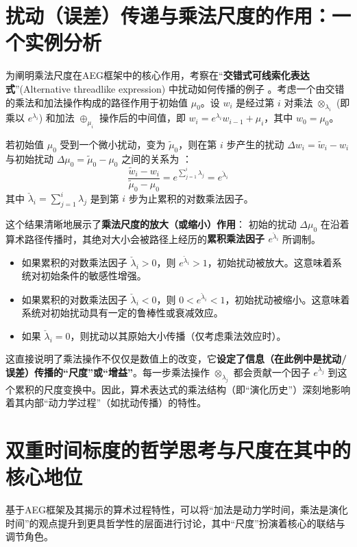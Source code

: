 \documentclass[UTF8]{ctexart}
\begin{document}
\section{扰动（误差）传递与乘法尺度的作用：一个实例分析}

为阐明乘法尺度在AEG框架中的核心作用，考察在“\textbf{交错式可线索化表达式}”(Alternative threadlike expression) 中扰动如何传播的例子 \cite[Sec 2.6]{YuanAEG}。考虑一个由交错的乘法和加法操作构成的路径作用于初始值 $\mu_0$。设 $w_i$ 是经过第 $i$ 对乘法 $\otimes_{\lambda_i}$ (即乘以 $e^{\lambda_i}$) 和加法 $\oplus_{\mu_i}$ 操作后的中间值，即 $w_i = e^{\lambda_i} w_{i-1} + \mu_i$，其中 $w_0 = \mu_0$。

若初始值 $\mu_0$ 受到一个微小扰动，变为 $\tilde{\mu}_0$，则在第 $i$ 步产生的扰动 $\Delta w_i = \tilde{w}_i - w_i$ 与初始扰动 $\Delta \mu_0 = \tilde{\mu}_0 - \mu_0$ 之间的关系为 \cite[Sec 2.6, Eq. 25]{YuanAEG}：
$$\frac{\tilde{w}_i - w_i}{\tilde{\mu}_0 - \mu_0} = e^{\sum_{j=1}^i \lambda_j} = e^{\check{\lambda}_i}$$
其中 $\check{\lambda}_i = \sum_{j=1}^i \lambda_j$ 是到第 $i$ 步为止累积的对数乘法因子。

这个结果清晰地展示了\textbf{乘法尺度的放大（或缩小）作用}：
初始的扰动 $\Delta \mu_0$ 在沿着算术路径传播时，其绝对大小会被路径上经历的\textbf{累积乘法因子 $e^{\check{\lambda}_i}$} 所调制。

\begin{itemize}
    \item 如果累积的对数乘法因子 $\check{\lambda}_i > 0$，则 $e^{\check{\lambda}_i} > 1$，初始扰动被放大。这意味着系统对初始条件的敏感性增强。
    \item 如果累积的对数乘法因子 $\check{\lambda}_i < 0$，则 $0 < e^{\check{\lambda}_i} < 1$，初始扰动被缩小。这意味着系统对初始扰动具有一定的鲁棒性或衰减效应。
    \item 如果 $\check{\lambda}_i = 0$，则扰动以其原始大小传播（仅考虑乘法效应时）。
\end{itemize}
这直接说明了乘法操作不仅仅是数值上的改变，它\textbf{设定了信息（在此例中是扰动/误差）传播的“尺度”或“增益”}。每一步乘法操作 $\otimes_{\lambda_j}$ 都会贡献一个因子 $e^{\lambda_j}$ 到这个累积的尺度变换中。因此，算术表达式的乘法结构（即“演化历史”）深刻地影响着其内部“动力学过程”（如扰动传播）的特性。

\section{双重时间标度的哲学思考与尺度在其中的核心地位}

基于AEG框架及其揭示的算术过程特性，可以将“加法是动力学时间，乘法是演化时间”的观点提升到更具哲学性的层面进行讨论，其中“尺度”扮演着核心的联结与调节角色。
\end{document}
